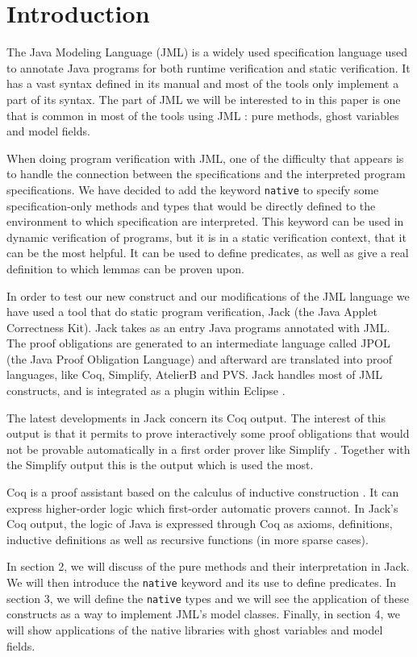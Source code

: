 
\section{Introduction}
The Java Modeling Language (JML) is a widely used specification language used to annotate Java programs 
for both runtime verification and static verification. It has a vast syntax defined in its manual and most 
of the tools only implement a part of its syntax. The part of JML we will be interested to in this paper
is one that is common in most of the tools using JML \cite{BurdyEtAl05:STTT}: pure methods,  
ghost variables and  model fields. 

When doing program verification with JML, one of the difficulty that appears
is to handle the connection between the specifications and the interpreted program specifications.
We have decided to add the keyword {\tt native}
to specify some specification-only methods and types that would be directly defined to
the environment to which specification are interpreted. This keyword can be used in dynamic 
verification of programs, but it is in a static verification context, that it can be the most helpful.
It can be used to define predicates, as well as give a real definition to which lemmas can
be proven upon.

In order to test our new construct and our modifications of the JML language we have used
a tool that do static program verification,  Jack 
(the Java Applet Correctness Kit)\cite{BRL-03-JACK, Jack-Web}. 
Jack takes as an entry Java programs annotated with JML. 
The proof obligations are generated to an intermediate language called JPOL (the Java
Proof Obligation Language) and afterward are translated into proof languages, like Coq, Simplify, AtelierB 
and PVS. 
Jack handles most of JML constructs, and is integrated as a plugin within Eclipse \cite{Eclipse-Web}.

The latest developments in Jack concern its Coq output. 
The interest of this output is that it permits to prove interactively some proof 
obligations that would not be provable automatically in a first order 
prover like Simplify \cite{simplify}.
Together with the Simplify output this is the output which is used the most.

Coq is a proof assistant based on the calculus of inductive construction \cite{BC-04-COQ}. 
It can express 
higher-order logic which first-order automatic provers cannot. In Jack's Coq output, the logic of 
Java is  expressed through Coq as axioms, definitions, inductive definitions as well as recursive 
functions (in more sparse cases).

In section 2,  we will discuss of the pure methods and their interpretation in Jack. We will then introduce
the {\tt native} keyword and its use to define predicates.
In section 3, we will define the {\tt native} types and we will see the application of these constructs 
as a way to implement JML's model classes.
Finally, in section 4, we will show applications of the native libraries with 
 ghost variables and model fields.
